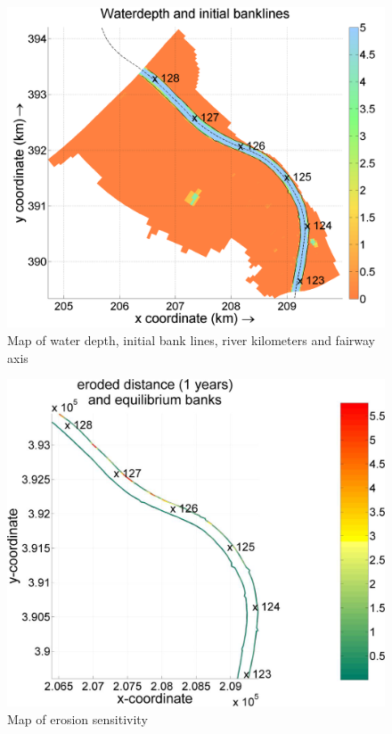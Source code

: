 \begin{figure}
\includegraphics[width=\textwidth]{figures/Fig2-4.png}
\caption{Map of water depth, initial bank lines, river kilometers and fairway axis}
\label{Fig2.4}
\end{figure}

\begin{figure}
\includegraphics[width=\textwidth]{figures/Fig2-5.png}
\caption{Map of erosion sensitivity}
\label{Fig2.5}
\end{figure}

